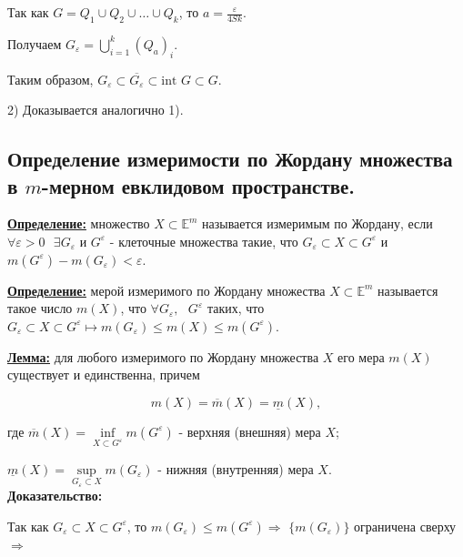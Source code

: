 \documentclass[a4paper,12pt]{article} %
\begin{document}
Так как $G = Q_1 \cup Q_2 \cup \ldots \cup Q_k$, то $a = \frac{\varepsilon}{4Sk}$.

Получаем $G_{\varepsilon} = \bigcup\limits_{i = 1}^k (Q_a)_i$.

Таким образом, $G_{\varepsilon} \subset \overline{G_{\varepsilon}} \subset \text{int } G \subset G$.

\vspace{3mm}
2) Доказывается аналогично 1).\\


\subsection{Определение измеримости по Жордану множества в $m$-мерном евклидовом пространстве.}

\underline{\textbf{Определение:}} множество $X \subset \mathbb{E}^m$ называется измеримым по Жордану, если $\forall \varepsilon > 0 \text{ }\exists G_{\varepsilon}$ и $G^{\varepsilon}$ - клеточные множества такие, что $G_{\varepsilon} \subset X \subset G^{\varepsilon}$ и $m(G^{\varepsilon}) - m(G_{\varepsilon}) < \varepsilon$. 

\vspace{3mm}

\underline{\textbf{Определение:}} мерой измеримого по Жордану множества $X \subset \mathbb{E}^m$ называется такое число $m(X)$, что $\forall G_{\varepsilon},\text{ } G^{\varepsilon}$ таких, что $G_{\varepsilon} \subset X \subset G^{\varepsilon} \longmapsto m(G_{\varepsilon}) \leqslant m(X) \leqslant m(G^{\varepsilon})$.

\vspace{3mm}

\underline{\textbf{Лемма:}} для любого измеримого по Жордану множества $X$ его мера $m(X)$ существует и единственна, причем

\begin{equation*}
	m(X) = \overline{m}(X) = \underline{m}(X),
\end{equation*}

\noindent где $\overline{m}(X) = \inf\limits_{X \subset G^{\varepsilon}} m(G^{\varepsilon})$ - верхняя (внешняя) мера $X$;

\noindent $\underline{m}(X) = \sup\limits_{G_{\varepsilon} \subset X} m(G_{\varepsilon})$ - нижняя (внутренняя) мера $X$.\\

\textbf{Доказательство:} 

Так как $G_{\varepsilon} \subset X \subset G^{\varepsilon}$, то $m(G_{\varepsilon}) \leqslant m(G^{\varepsilon}) \Rightarrow$ $\{m(G_{\varepsilon})\}$ ограничена сверху $\Rightarrow$
\end{document}
